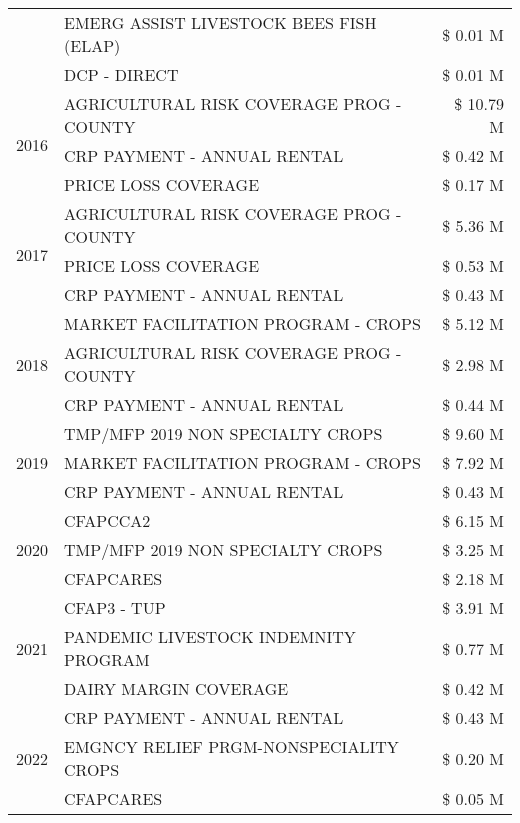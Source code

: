 \begin{tabular}{llr}
 & EMERG ASSIST LIVESTOCK BEES FISH (ELAP) & \$ 0.01 M \\
 & DCP - DIRECT & \$ 0.01 M \\
\cline{1-3}
\multirow[t]{3}{*}{2016} & AGRICULTURAL RISK COVERAGE PROG - COUNTY & \$ 10.79 M \\
 & CRP PAYMENT - ANNUAL RENTAL & \$ 0.42 M \\
 & PRICE LOSS COVERAGE & \$ 0.17 M \\
\cline{1-3}
\multirow[t]{3}{*}{2017} & AGRICULTURAL RISK COVERAGE PROG - COUNTY & \$ 5.36 M \\
 & PRICE LOSS COVERAGE & \$ 0.53 M \\
 & CRP PAYMENT - ANNUAL RENTAL & \$ 0.43 M \\
\cline{1-3}
\multirow[t]{3}{*}{2018} & MARKET FACILITATION PROGRAM - CROPS & \$ 5.12 M \\
 & AGRICULTURAL RISK COVERAGE PROG - COUNTY & \$ 2.98 M \\
 & CRP PAYMENT - ANNUAL RENTAL & \$ 0.44 M \\
\cline{1-3}
\multirow[t]{3}{*}{2019} & TMP/MFP 2019 NON SPECIALTY CROPS & \$ 9.60 M \\
 & MARKET FACILITATION PROGRAM - CROPS & \$ 7.92 M \\
 & CRP PAYMENT - ANNUAL RENTAL & \$ 0.43 M \\
\cline{1-3}
\multirow[t]{3}{*}{2020} & CFAPCCA2 & \$ 6.15 M \\
 & TMP/MFP 2019 NON SPECIALTY CROPS & \$ 3.25 M \\
 & CFAPCARES & \$ 2.18 M \\
\cline{1-3}
\multirow[t]{3}{*}{2021} & CFAP3 - TUP & \$ 3.91 M \\
 & PANDEMIC LIVESTOCK INDEMNITY PROGRAM & \$ 0.77 M \\
 & DAIRY MARGIN COVERAGE & \$ 0.42 M \\
\cline{1-3}
\multirow[t]{3}{*}{2022} & CRP PAYMENT - ANNUAL RENTAL & \$ 0.43 M \\
 & EMGNCY RELIEF PRGM-NONSPECIALITY CROPS & \$ 0.20 M \\
 & CFAPCARES & \$ 0.05 M \\
\cline{1-3}
\bottomrule
\end{tabular}
